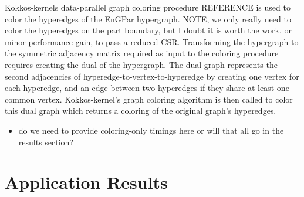 \documentclass[graybox]{svmult}
\begin{document}
Kokkos-kernels data-parallel graph coloring procedure REFERENCE is used to
color the hyperedges of the EnGPar hypergraph.
{\color{red}NOTE, we only really need to color the hyperedges on the part boundary,
but I doubt it is worth the work, or minor performance gain, to pass a reduced CSR.}
Transforming the hypergraph to the symmetric adjacency matrix required as input
to the coloring procedure requires creating the dual of the hypergraph.
The dual graph represents the second adjacencies of
hyperedge-to-vertex-to-hyperedge by creating one vertex for each hyperedge, and
an edge between two hyperedges if they share at least one common vertex.
Kokkos-kernel's graph coloring algorithm is then called to color this dual graph
which returns a coloring of the original graph's hyperedges.

\begin{itemize}
  \item do we need to provide coloring-only timings here or will that all go in
    the results section?
\end{itemize}

\section{Application Results} \label{sec:results}
\end{document}
